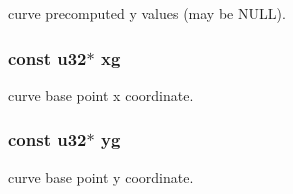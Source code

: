 curve precomputed y values (may be N\+U\+L\+L). \hypertarget{struct__t__curve_ac386d0e2f79d9a0298b32b5f401a4215}{
\subsubsection[{xg}]{\setlength{\rightskip}{0pt plus 5cm}const u32$\ast$ xg}}\label{struct__t__curve_ac386d0e2f79d9a0298b32b5f401a4215}
curve base point x coordinate. \hypertarget{struct__t__curve_aefd5cee3d48669caaf076f0c596ba644}{
\subsubsection[{yg}]{\setlength{\rightskip}{0pt plus 5cm}const u32$\ast$ yg}}\label{struct__t__curve_aefd5cee3d48669caaf076f0c596ba644}
curve base point y coordinate. 